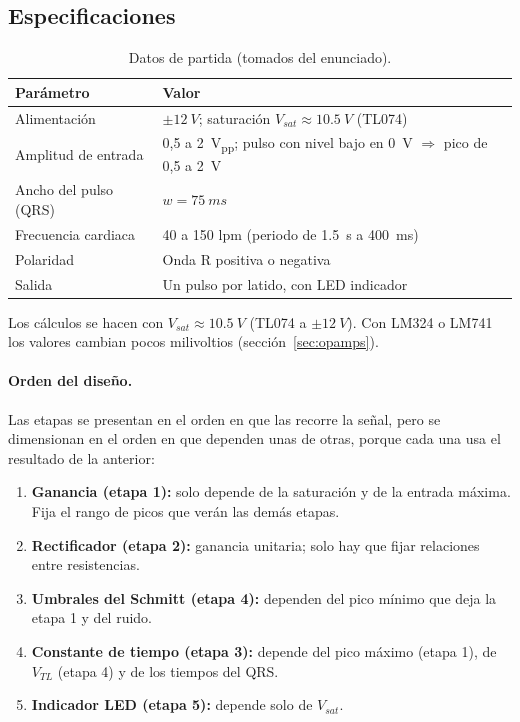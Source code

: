 \documentclass[11pt,letterpaper]{article}
\newcommand{\VTL}{V_{TL}}
\newcommand{\Vsat}{V_{sat}}
\begin{document}
\subsection{Especificaciones}

\begin{table}[H]
\centering
\caption{Datos de partida (tomados del enunciado).}\label{tab:specs}
\begin{tabularx}{\linewidth}{@{}lX@{}}
\toprule
Parámetro & Valor \\
\midrule
Alimentación & $\pm\SI{12}{V}$; saturación $\Vsat\approx\SI{10,5}{V}$ (TL074) \\
Amplitud de entrada & 0,5 a \SI{2}{V_{pp}}; pulso con nivel bajo en \SI{0}{V} $\Rightarrow$ pico de 0,5 a \SI{2}{V} \\
Ancho del pulso (QRS) & $w=\SI{75}{ms}$ \\
Frecuencia cardiaca & 40 a 150 lpm (periodo de \SI{1,5}{s} a \SI{400}{ms}) \\
Polaridad & Onda R positiva o negativa \\
Salida & Un pulso por latido, con LED indicador \\
\bottomrule
\end{tabularx}
\end{table}

Los cálculos se hacen con $\Vsat\approx\SI{10,5}{V}$ (TL074 a $\pm\SI{12}{V}$). Con LM324 o LM741 los valores cambian pocos milivoltios (sección~\ref{sec:opamps}).

\paragraph{Orden del diseño.} Las etapas se presentan en el orden en que las recorre la señal, pero se dimensionan en el orden en que dependen unas de otras, porque cada una usa el resultado de la anterior:
\begin{enumerate}
  \item \textbf{Ganancia (etapa 1):} solo depende de la saturación y de la entrada máxima. Fija el rango de picos que verán las demás etapas.
  \item \textbf{Rectificador (etapa 2):} ganancia unitaria; solo hay que fijar relaciones entre resistencias.
  \item \textbf{Umbrales del Schmitt (etapa 4):} dependen del pico mínimo que deja la etapa 1 y del ruido.
  \item \textbf{Constante de tiempo (etapa 3):} depende del pico máximo (etapa 1), de $\VTL$ (etapa 4) y de los tiempos del QRS.
  \item \textbf{Indicador LED (etapa 5):} depende solo de $\Vsat$.
\end{enumerate}
\end{document}
